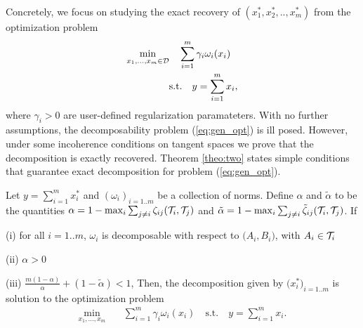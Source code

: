 \documentclass{article}
\begin{document}
Concretely, we focus on studying the exact recovery of $(x_{1}^*,x_{2}^*,..,x_{m}^*)$ from the optimization problem 
\begin{align}
\label{eq:gen_opt}
\min_{x_{1},...,x_{m}\in\mathcal{D}} &\quad \sum_{i=1}^{m} \gamma_{i}\omega_{i}(x_{i})\\
&\text{s.t.} \quad y=\sum_{i=1}^{m}x_{i}, \nonumber
\end{align}
where $\gamma_{i}>0$ are  user-defined regularization paramateters. With no further assumptions, the decomposability problem (\ref{eq:gen_opt}) is ill posed. However, under some incoherence conditions on tangent spaces we prove that the decomposition is exactly recovered. Theorem \ref{theo:two} states simple conditions that guarantee exact decomposition for problem  (\ref{eq:gen_opt}).
\begin{theorem}
\label{theo:two}
Let $y=\sum_{i=1}^{m}x_{i}^*$ and  $(\omega_{i})_{i=1..m}$ be a collection of norms. Define $\alpha$ and $\tilde{\alpha}$ to be the quantities $\alpha=1-\max_{i} \sum_{j\neq i} \zeta_{ij}(\mathcal{T}_i,\mathcal{T}_j)$ and $\tilde{\alpha}=1-\max_{i} \sum_{j\neq i} \tilde{\zeta}_{ij}(\mathcal{T}_i,\mathcal{T}_j)$. If  
\BET
\item[(i)] for all $i=1..m$, $\omega_{i}$ is decomposable with respect to $\big(A_i,B_i\big)$, with $A_i\in\mathcal{T}_i$ 
\item[(ii)]  $\alpha>0$ %
\item[(iii)] $\frac{m(1-\alpha)}{\alpha}+ (1-\tilde{\alpha})<1$, %
\EET
Then, the  decomposition given by $\big(x_{i}^*\big)_{i=1..m}$ is solution to the optimization problem \begin{align*}
\min_{x_{1},...,x_{m}} &\quad \sum_{i=1}^{m} \gamma_{i}\omega_{i}(x_{i})\quad \text{s.t.} \quad y=\sum_{i=1}^{m}x_{i}.
\end{align*}
\end{theorem}
\end{document}
